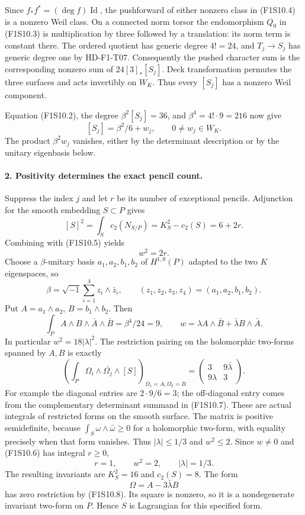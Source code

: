 Since $f_*f^*=(\deg f)\operatorname{Id}$, the pushforward
of either nonzero class in (F1S10.4) is a nonzero Weil class.
On a connected norm torsor the endomorphism $Q_0$ in
(F1S10.3) is multiplication by three followed by a
translation: its norm term is constant there.
The ordered quotient has generic degree $4!=24$, and
$T_j\to S_j$ has generic degree one by HD-F1-T07.
Consequently the pushed character sum is the corresponding
nonzero sum of $24[3]_*[S_j]$. Deck transformation permutes
the three surfaces and acts invertibly on $W_K$.
Thus every $[S_j]$ has a nonzero Weil component.

Equation (F1S10.2), the degree $\beta^2[S_j]=36$, and
$\beta^4=4!\cdot9=216$ now give
\[
                    [S_j]=\beta^2/6+w_j,\qquad 0\ne w_j\in W_K.
 \tag{F1S10.5}
\]
The product $\beta^2w_j$ vanishes, either by the determinant
description or by the unitary eigenbasis below.

\paragraph{2. Positivity determines the exact pencil count.}
Suppress the index $j$ and let $r$ be its number of
exceptional pencils. Adjunction for the smooth embedding
$S\subset P$ gives
\[
 [S]^2=\int_S c_2(N_{S/P})=K_S^2-c_2(S)=6+2r.
\]
Combining with (F1S10.5) yields
\[
                              w^2=2r.
 \tag{F1S10.6}
\]
Choose a $\beta$-unitary basis $a_1,a_2,b_1,b_2$ of
$H^{1,0}(P)$ adapted to the two $K$ eigenspaces, so
\[
 \beta=\sqrt{-1}\sum_{i=1}^4z_i\wedge\bar z_i,
 \qquad(z_1,z_2,z_3,z_4)=(a_1,a_2,b_1,b_2).
\]
Put $A=a_1\wedge a_2$, $B=b_1\wedge b_2$. Then
\[
 \int_P A\wedge B\wedge\bar A\wedge\bar B
        =\beta^4/24=9,\qquad
 w=\lambda A\wedge\bar B+\bar\lambda B\wedge\bar A.
 \tag{F1S10.7}
\]
In particular $w^2=18|\lambda|^2$.
The restriction pairing on the holomorphic two-forms
spanned by $A,B$ is exactly
\[
 \left(\int_P\Omega_i\wedge\overline{\Omega_j}\wedge[S]\right)
       _{\Omega_1=A,\Omega_2=B}
   =\begin{pmatrix}3&9\bar\lambda\\9\lambda&3\end{pmatrix}.
 \tag{F1S10.8}
\]
For example the diagonal entries are $2\cdot9/6=3$;
the off-diagonal entry comes from the complementary
determinant summand in (F1S10.7). These are actual
integrals of restricted forms on the smooth surface.
The matrix is positive semidefinite, because
$\int_S\omega\wedge\bar\omega\geq0$ for a holomorphic
two-form, with equality precisely when that form vanishes.
Thus $|\lambda|\leq1/3$ and $w^2\leq2$.
Since $w\ne0$ and (F1S10.6) has integral $r\geq0$,
\[
                    r=1,\qquad w^2=2,\qquad |\lambda|=1/3.
 \tag{F1S10.9}
\]
The resulting invariants are $K_S^2=16$ and $c_2(S)=8$.
The form
\[
                         \Omega=A-3\bar\lambda B
 \tag{F1S10.10}
\]
has zero restriction by (F1S10.8). Its square is nonzero,
so it is a nondegenerate invariant two-form on $P$.
Hence $S$ is Lagrangian for this specified form.

